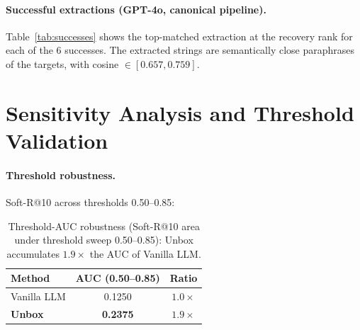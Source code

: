 \documentclass[11pt]{article}
\begin{document}
\paragraph{Successful extractions (GPT-4o, canonical pipeline).} Table~\ref{tab:successes} shows the top-matched extraction at the recovery rank for each of the 6 successes. The extracted strings are semantically close paraphrases of the targets, with cosine $\in [0.657, 0.759]$.

\begin{table}[h]
\centering
\caption{Successful target recoveries (6 of 10). For each paradigm, the extraction at the confidence rank that first cleared the 0.65 threshold, with cosine similarity to the closest target alias.}
\label{tab:successes}
\footnotesize
\setlength{\tabcolsep}{3pt}
\end{table}

\section{Sensitivity Analysis and Threshold Validation}\label{app:sensitivity}

\paragraph{Threshold robustness.} Soft-R@10 across thresholds 0.50--0.85:

\begin{table}[h]
\centering
\caption{Threshold-AUC robustness (Soft-R@10 area under threshold sweep 0.50--0.85): Unbox accumulates $1.9{\times}$ the AUC of Vanilla LLM.}
\label{tab:threshold_auc}
\footnotesize
\setlength{\tabcolsep}{4pt}
\begin{tabular}{lcc}
\toprule
Method & AUC (0.50--0.85) & Ratio \\
\midrule
Vanilla LLM & 0.1250 & $1.0\times$ \\
\textbf{Unbox} & \textbf{0.2375} & $\mathbf{1.9\times}$ \\
\bottomrule
\end{tabular}
\end{table}
\end{document}
